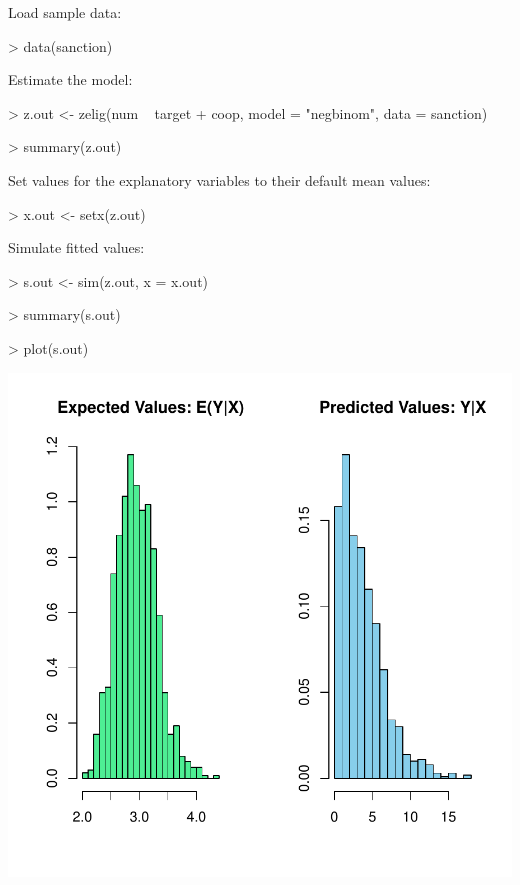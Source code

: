Load sample data:  
\begin{Schunk}
\begin{Sinput}
> data(sanction)
\end{Sinput}
\end{Schunk}
Estimate the model:  
\begin{Schunk}
\begin{Sinput}
> z.out <- zelig(num ~ target + coop, model = "negbinom", data = sanction)
\end{Sinput}
\end{Schunk}
\begin{Schunk}
\begin{Sinput}
> summary(z.out)
\end{Sinput}
\end{Schunk}
Set values for the explanatory variables to their default mean values:  
\begin{Schunk}
\begin{Sinput}
> x.out <- setx(z.out)
\end{Sinput}
\end{Schunk}
Simulate fitted values:  
\begin{Schunk}
\begin{Sinput}
> s.out <- sim(z.out, x = x.out)
\end{Sinput}
\end{Schunk}
\begin{Schunk}
\begin{Sinput}
> summary(s.out)
\end{Sinput}
\end{Schunk}
\begin{center}
\begin{Schunk}
\begin{Sinput}
> plot(s.out)
\end{Sinput}
\end{Schunk}
\includegraphics{vigpics/negbin-Example1Plot}
\end{center}
